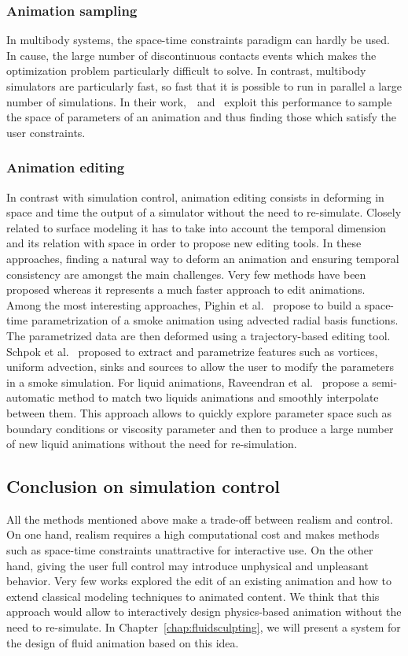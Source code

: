 \subsubsection{Animation sampling}
In multibody systems, the space-time constraints paradigm can hardly be used. In cause, the large number of discontinuous contacts events which makes the optimization problem particularly difficult to solve. In contrast, multibody simulators are particularly fast, so fast that it is possible to run in parallel a large number of simulations. In their work,~\cite{Chenney2000}~and~\cite{Twigg2007} exploit this performance to sample the space of parameters of an animation and thus finding those which satisfy the user constraints.

\subsubsection{Animation editing} 
In contrast with simulation control, animation editing consists in deforming in space and time the output of a simulator without the need to re-simulate.
Closely related to surface modeling it has to take into account the temporal dimension and its relation with space in order to propose new editing tools. 
In these approaches, finding a natural way to deform an animation and ensuring temporal consistency are amongst the main challenges.
Very few methods have been proposed whereas it represents a much faster approach to edit animations.
Among the most interesting approaches, Pighin et al.~\cite{Pighin2004} propose to build a space-time parametrization of a smoke animation using advected radial basis functions. The parametrized data are then deformed using a trajectory-based editing tool.
Schpok et al.~\cite{Schpok2005} proposed to extract and parametrize features such as vortices, uniform advection, sinks and sources to allow the user to modify the parameters in a smoke simulation.
For liquid animations, Raveendran et al.~\cite{Raveendran2014} propose a semi-automatic method to match two liquids animations and smoothly interpolate between them. 
This approach allows to quickly explore parameter space such as boundary conditions or viscosity parameter and then to produce a large number of new liquid animations without the need for re-simulation.

\subsection{Conclusion on simulation control}

All the methods mentioned above make a trade-off between realism and control.
On one hand, realism requires a high computational cost and makes methods such as space-time constraints unattractive for interactive use.
On the other hand, giving the user full control may introduce unphysical and unpleasant behavior.
Very few works explored the edit of an existing animation and how to extend classical modeling techniques to animated content.
We think that this approach would allow to interactively design physics-based animation without the need to re-simulate.
In Chapter~\ref{chap:fluidsculpting}, we will present a system for the design of fluid animation based on this idea.
